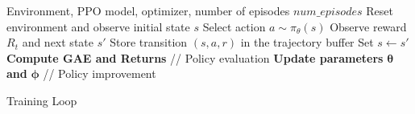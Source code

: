 \begin{algorithm}
    \begin{algorithmic}[1]
        \Require Environment, PPO model, optimizer, number of episodes $num\_episodes$
            \State Reset environment and observe initial state $s$
                \State Select action $a \sim \pi_{\theta}(s)$
                \State Observe reward $R_t$ and next state $s'$
                \State Store transition $(s, a, r)$ in the trajectory buffer
                \State Set $s \leftarrow s'$
            \EndFor
            \State \textbf{Compute GAE and Returns} // Policy evaluation
            \State \textbf{Update parameters} $\boldsymbol{\theta}$ \textbf{and} $\boldsymbol{\phi}$ // Policy improvement
        \EndFor
    \end{algorithmic}
    \caption{Training Loop}
    \label{alg:algorithm}
\end{algorithm}
